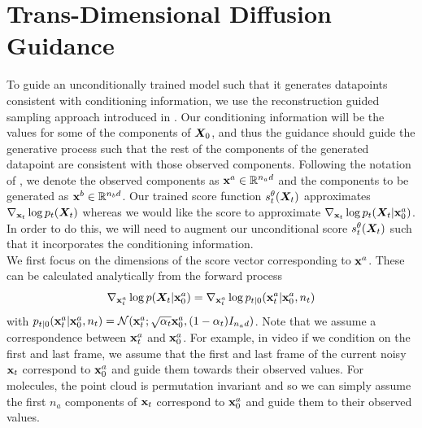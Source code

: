 \section{Trans-Dimensional Diffusion Guidance}
\label{sec:tddm-ApdxDiffGuide}

To guide an unconditionally trained model such that it generates datapoints consistent with conditioning information, we use the reconstruction guided sampling approach introduced in \cite{ho2022video}. Our conditioning information will be the values for some of the components of ${\bm{X}}_0$, and thus the guidance should guide the generative process such that the rest of the components of the generated datapoint are consistent with those observed components. Following the notation of \cite{ho2022video}, we denote the observed components as ${\mathbf{x}}^a \in \mathbb{R}^{n_a d}$ and the components to be generated as ${\mathbf{x}}^b \in \mathbb{R}^{n_b d}$. Our trained score function $s_t^\theta({\bm{X}}_t)$ approximates $\nabla_{{\mathbf{x}}_t} \log p_t({\bm{X}}_t)$ whereas we would like the score to approximate $\nabla_{{\mathbf{x}}_t} \log p_t({\bm{X}}_t | {\mathbf{x}}_0^a)$. In order to do this, we will need to augment our unconditional score $s_t^\theta({\bm{X}}_t)$ such that it incorporates the conditioning information.\\

We first focus on the dimensions of the score vector corresponding to ${\mathbf{x}}^a$. These can be calculated analytically from the forward process
\begin{equation}
    \nabla_{{\mathbf{x}}_t^a} \log p({\bm{X}}_t | {\mathbf{x}}_0^a) = \nabla_{{\mathbf{x}}_t^a} \log p_{t|0}({\mathbf{x}}_t^a | {\mathbf{x}}_0^a, n_t)
\end{equation}
with $p_{t|0}({\mathbf{x}}_t^a | {\mathbf{x}}_0^a, n_t) = \mathcal{N}({\mathbf{x}}_t^a; \sqrt{\alpha_t} {\mathbf{x}}_0^a, (1 - \alpha_t) I_{n_a d})$. Note that we assume a correspondence between ${\mathbf{x}}_t^a$ and ${\mathbf{x}}_0^a$. For example, in video if we condition on the first and last frame, we assume that the first and last frame of the current noisy ${\mathbf{x}}_t$ correspond to ${\mathbf{x}}_0^a$ and guide them towards their observed values. For molecules, the point cloud is permutation invariant and so we can simply assume the first $n_a$ components of ${\mathbf{x}}_t$ correspond to ${\mathbf{x}}_0^a$ and guide them to their observed values.\\

